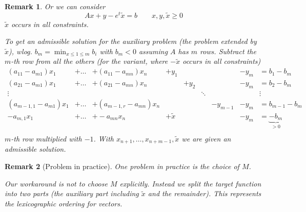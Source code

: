 \documentclass[a4paper]{article}
\numberwithin{lecref}{subsection}
\newtheorem*{Remark}{Remark}
\begin{document}
\begin{Remark}
	Or we can consider
	\[ Ax + y - e^t \tilde x = b \qquad x, y, \tilde x \geq 0 \]
	$\tilde x$ occurs in all constraints.

	To get an admissible solution for the auxiliary problem (the problem extended by $\tilde x$), wlog. $b_m = \min_{x \leq 1 \leq m} b_i$ with $b_m < 0$ assuming $A$ has $m$ rows.
	Subtract the $m$-th row from all the others (for the variant, where $-\tilde x$ occurs in all constraints)
	\begin{align}
		\label{mat}
		(a_{11} - a_{m1}) x_1 &+ \dots &+ (a_{11} - a_{mn}) x_n &+ y_1  &       &        &          & -y_m &= b_1 - b_m \\
		(a_{21} - a_{m1}) x_1 &+ \dots &+ (a_{21} - a_{mn}) x_n &       &+ y_2  &        &          & -y_m &= b_2 - b_m \nonumber\\
		\vdots                &        &                        &       &       & \ddots &          &      &\vdots \nonumber\\
		(a_{m-1,1} - a_{m1}) x_1 &+ \dots &+ (a_{m-1,r} - a_{mn}) x_n & &       &        & -y_{m-1} & -y_m &= b_{m-1} - b_m \nonumber\\
		-a_{m,1} x_1 &+ \dots &+ -a_{mn} x_n & + \tilde x &       &        &  & -y_m &= \underbrace{-b_{m}}_{>0} \nonumber\\
	\end{align}
	$m$-th row multiplied with $-1$.
	With $x_{n+1}, \dots, x_{n+m-1}, \tilde x$ we are given an admissible solution.
\end{Remark}

\begin{Remark}[Problem in practice]
	One problem in practice is the choice of $M$.

	Our workaround is not to choose $M$ explicitly. Instead we split the target function into two parts (the auxiliary part including $\tilde x$ and the remainder).
	This represents the lexicographic ordering for vectors.
\end{Remark}
\end{document}
